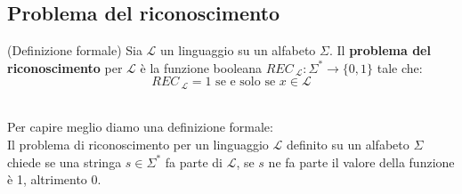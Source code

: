 \subsection{Problema del riconoscimento}\label{riconoscimento}
\colorbox{SALZO}{\parbox{\dimexpr\linewidth-2\fboxsep}{\begin{definition}
   (Definizione formale) Sia $\mathcal{L}$ un linguaggio su un alfabeto $\Sigma$.
   Il \textbf{problema del riconoscimento} per $\mathcal{L}$ è la funzione booleana
   $REC_{\ \mathcal{L}}: \Sigma^* \to \{0,1 \}$ tale che:
   \[  REC_{\ \mathcal{L}} = 1 \text{ se e solo se } x \in \mathcal{L}    \]
\end{definition}}} \smallskip\\
Per capire meglio diamo una definizione formale:\\
Il problema di riconoscimento per un linguaggio $\mathcal{L}$ definito su un
alfabeto $\Sigma$ chiede se una stringa $s \in \Sigma^*$ fa parte di $\mathcal{L}$,
se $s$ ne fa parte il valore della funzione è 1, altrimento 0.



